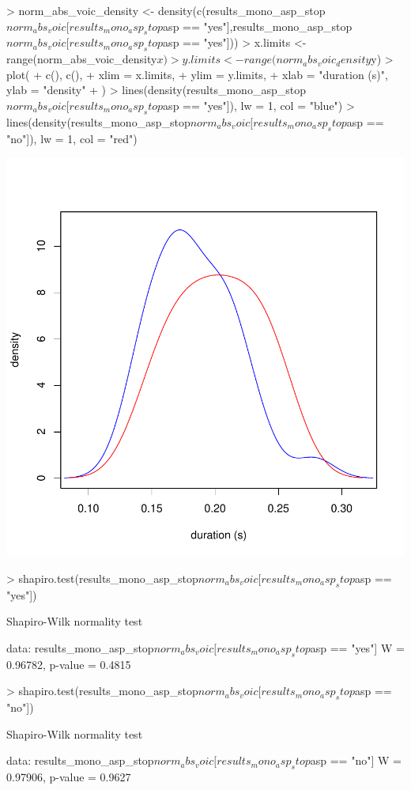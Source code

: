 \documentclass{article}
\begin{document}
\begin{Schunk}
\begin{Sinput}
> norm_abs_voic_density <- density(c(results_mono_asp_stop$norm_abs_voic[results_mono_asp_stop$asp == "yes"],results_mono_asp_stop$norm_abs_voic[results_mono_asp_stop$asp == "yes"]))
> x.limits <- range(norm_abs_voic_density$x)
> y.limits <- range(norm_abs_voic_density$y)
> plot(
+ c(), c(),
+ xlim = x.limits,
+ ylim = y.limits,
+ xlab = "duration (s)", ylab = "density"
+ )
> lines(density(results_mono_asp_stop$norm_abs_voic[results_mono_asp_stop$asp == "yes"]), lw = 1, col = "blue")
> lines(density(results_mono_asp_stop$norm_abs_voic[results_mono_asp_stop$asp == "no"]), lw = 1, col = "red")
\end{Sinput}
\end{Schunk}
\includegraphics{analysis-008}

\begin{Schunk}
\begin{Sinput}
> shapiro.test(results_mono_asp_stop$norm_abs_voic[results_mono_asp_stop$asp == "yes"])
\end{Sinput}
\begin{Soutput}
	Shapiro-Wilk normality test

data:  results_mono_asp_stop$norm_abs_voic[results_mono_asp_stop$asp ==     "yes"]
W = 0.96782, p-value = 0.4815
\end{Soutput}
\begin{Sinput}
> shapiro.test(results_mono_asp_stop$norm_abs_voic[results_mono_asp_stop$asp == "no"])
\end{Sinput}
\begin{Soutput}
	Shapiro-Wilk normality test

data:  results_mono_asp_stop$norm_abs_voic[results_mono_asp_stop$asp ==     "no"]
W = 0.97906, p-value = 0.9627
\end{Soutput}
\end{Schunk}
\end{document}
